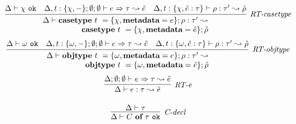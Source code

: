 


\begin{figure}
\centering
\[
\begin{array}{c}
\infer[\textit{RT-casetype}]
          {\renewcommand{\arraystretch}{1}
	    \begin{array}{r}
	    \Delta \vdash  \keyw{casetype}~ t~=\{\chi, \keyw{metadata}=e\}; \rho :\tau' \leadsto \\
            \keyw{casetype}~ t~=\{\chi, \keyw{metadata}=\hat{e}\};\hat{\rho}
            \end{array}
       }
	  {\Delta \vdash \chi~\texttt{ok} & \Delta, t:\{\chi,-\}; \emptyset; \emptyset \vdash e \Rightarrow \tau \leadsto \hat{e} & \Delta, t:\{\chi, \hat e:\tau\} \vdash \rho :\tau'\leadsto \hat{\rho} }
	   \\[3ex] 

\infer[\textit{RT-objtype}]
          {\renewcommand{\arraystretch}{1}
	    \begin{array}{r}
	    \Delta \vdash  \keyw{objtype}~ t~=\{{\omega}, \keyw{metadata}=e\}; \rho: \tau'\leadsto\\
            \keyw{objtype}~ t~=\{{\omega}, \keyw{metadata}=\hat{e}\}; \hat{\rho}
            \end{array}
       }
	  {\Delta \vdash \omega~\texttt{ok} & \Delta, t:\{\omega,-\}; \emptyset; \emptyset \vdash e \Rightarrow \tau \leadsto \hat{e} & \Delta, t:\{\omega, \hat e:\tau\} \vdash \rho :\tau'\leadsto \hat{\rho} }
	   \\[3ex] 

\infer[\textit{RT-e}]
	{\Delta \vdash  e:\tau \leadsto \hat{e}} 
	{\Delta; \emptyset; \emptyset \vdash e \Rightarrow \tau \leadsto \hat{e}}\\[3ex]

\infer[\textit{C-decl}]
	{\Delta \vdash  C~\keyw{of}~\tau~\texttt{ok}} 
	{\Delta \vdash \tau   }\\[3ex]


\end{array}\]
\end{figure}
